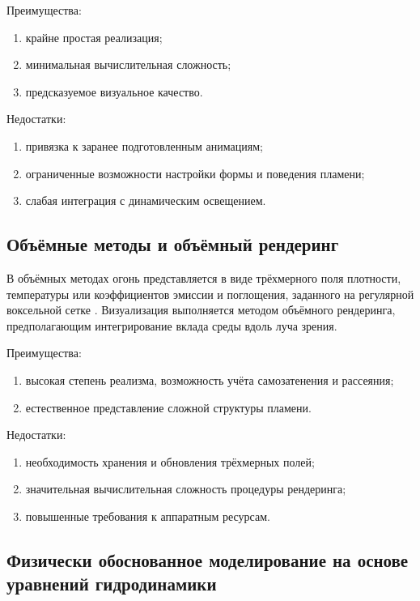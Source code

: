 Преимущества:
\begin{enumerate}
	\item крайне простая реализация;
	\item минимальная вычислительная сложность;
	\item предсказуемое визуальное качество.
\end{enumerate}

Недостатки:
\begin{enumerate}
	\item привязка к заранее подготовленным анимациям;
	\item ограниченные возможности настройки формы и поведения пламени;
	\item слабая интеграция с динамическим освещением.
\end{enumerate}

\subsection{Объёмные методы и объёмный рендеринг}

В объёмных методах огонь представляется в виде трёхмерного поля плотности, температуры или коэффициентов эмиссии и поглощения, заданного на регулярной воксельной сетке \cite{VolumeRendering}. Визуализация выполняется методом объёмного рендеринга, предполагающим интегрирование вклада среды вдоль луча зрения.

Преимущества:
\begin{enumerate}
	\item высокая степень реализма, возможность учёта самозатенения и рассеяния;
	\item естественное представление сложной структуры пламени.
\end{enumerate}

Недостатки:
\begin{enumerate}
	\item необходимость хранения и обновления трёхмерных полей;
	\item значительная вычислительная сложность процедуры рендеринга;
	\item повышенные требования к аппаратным ресурсам.
\end{enumerate}

\subsection{Физически обоснованное моделирование на основе уравнений гидродинамики}

